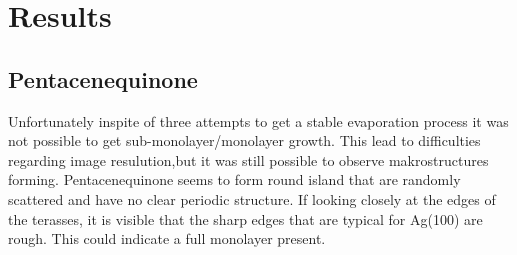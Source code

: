 \chapter{Results}
\section{Pentacenequinone}
Unfortunately inspite of three attempts to get a stable evaporation process it was not possible to get sub-monolayer/monolayer growth.
This lead to difficulties regarding image resulution,but it was still possible to observe makrostructures forming.
Pentacenequinone seems to form round island that are randomly scattered and have no clear periodic structure.
If looking closely at the edges of the terasses, it is visible that the sharp edges that are typical for Ag(100) are rough.
This could indicate a full monolayer present.

\newpage
